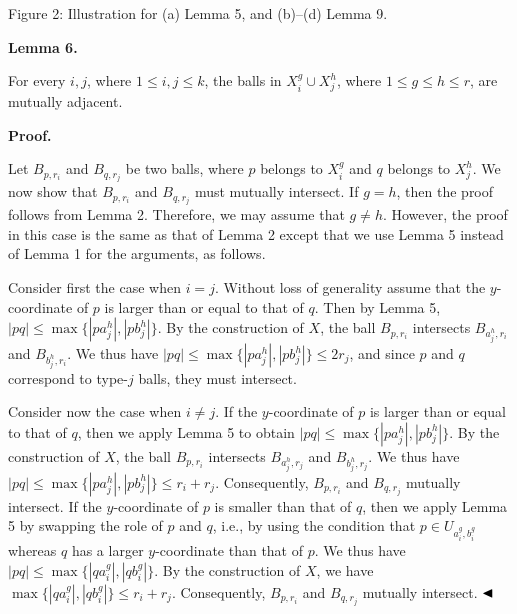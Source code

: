 \documentclass[10pt,a4paper]{amsart}
\begin{document}
 Figure 2:  Illustration for (a) Lemma 5, and (b)–(d) Lemma 9.   
\par\medskip\noindent\textbf{Lemma 6.}\par
For every $i,j$, where $1\leq i,j\leq k$, the balls in $X^{g}_{i}\cup X^{h}_{j}$, where $1\leq g\leq h\leq r$, are mutually adjacent.
\par
\par
\par
\par
\par\medskip\noindent\textbf{Proof.}\par
Let $B_{p,r_{i}}$ and $B_{q,r_{j}}$ be two balls, where $p$ belongs to $X^{g}_{i}$ and $q$ belongs to $X^{h}_{j}$. We now show that $B_{p,r_{i}}$ and $B_{q,r_{j}}$ must mutually intersect. If $g=h$, then the proof follows from Lemma 2. Therefore, we may assume that $g\not=h$. However, the proof in this case is the same as that of Lemma 2 except that we use Lemma 5 instead of Lemma 1 for the arguments, as follows.
\par
\par
Consider first the case when $i=j$. Without loss of generality assume that the $y$-coordinate of $p$ is larger than or equal to that of $q$. Then by Lemma 5, $|pq|\leq\max\{|pa^{h}_{j}|,|pb^{h}_{j}|\}$. By the construction of $X$, the ball $B_{p,r_{i}}$ intersects $B_{a^{h}_{j},r_{i}}$ and $B_{b^{h}_{j},r_{i}}$. We thus have $|pq|\leq\max\{|pa^{h}_{j}|,|pb^{h}_{j}|\}\leq 2r_{j}$, and since $p$ and $q$ correspond to type-$j$ balls, they must intersect.
\par
\par
Consider now the case when $i\not=j$. If the $y$-coordinate of $p$ is larger than or equal to that of $q$, then we apply Lemma 5 to obtain $|pq|\leq\max\{|pa^{h}_{j}|,|pb^{h}_{j}|\}$. By the construction of $X$, the ball $B_{p,r_{i}}$ intersects $B_{a^{h}_{j},r_{j}}$ and $B_{b^{h}_{j},r_{j}}$. We thus have $|pq|\leq\max\{|pa^{h}_{j}|,|pb^{h}_{j}|\}\leq r_{i}+r_{j}$. Consequently, $B_{p,r_{i}}$ and $B_{q,r_{j}}$ mutually intersect. If the $y$-coordinate of $p$ is smaller than that of $q$, then we apply Lemma 5 by swapping the role of $p$ and $q$, i.e., by using the condition that $p\in U_{a^{g}_{i},b^{g}_{i}}$ whereas $q$ has a larger $y$-coordinate than that of $p$. We thus have $|pq|\leq\max\{|qa^{g}_{i}|,|qb^{g}_{i}|\}$. By the construction of $X$, we have $\max\{|qa^{g}_{i}|,|qb^{g}_{i}|\}\leq r_{i}+r_{j}$. Consequently, $B_{p,r_{i}}$ and $B_{q,r_{j}}$ mutually intersect. $\hfill\blacktriangleleft$
\par
\end{document}
